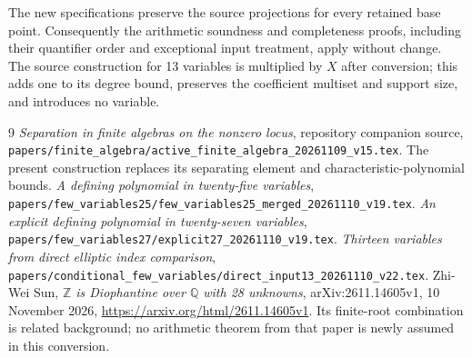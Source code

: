\documentclass[11pt,a4paper]{article}
\newcommand{\Q}{\mathbb Q}\newcommand{\Z}{\mathbb Z}
\begin{document}
The new specifications preserve the source projections for every retained
base point. Consequently the arithmetic soundness and completeness proofs,
including their quantifier order and exceptional input treatment, apply
without change. The source construction for 13 variables is multiplied by
$X$ after conversion; this adds one to its degree bound, preserves the
coefficient multiset and support size, and introduces no variable.

\begin{thebibliography}{9}
 \emph{Separation in finite algebras on the nonzero locus},
repository companion source, \nolinkurl{papers/finite_algebra/active_finite_algebra_20261109_v15.tex}.
The present construction replaces its separating element and characteristic-polynomial bounds.
 \emph{A defining polynomial in twenty-five variables},
\nolinkurl{papers/few_variables25/few_variables25_merged_20261110_v19.tex}.
 \emph{An explicit defining polynomial in twenty-seven variables},
\nolinkurl{papers/few_variables27/explicit27_20261110_v19.tex}.
 \emph{Thirteen variables from direct elliptic index comparison},
\nolinkurl{papers/conditional_few_variables/direct_input13_20261110_v22.tex}.
 Zhi-Wei Sun, \emph{$\Z$ is Diophantine over $\Q$ with 28 unknowns},
arXiv:2611.14605v1, 10 November 2026,
\url{https://arxiv.org/html/2611.14605v1}.
Its finite-root combination is related background; no arithmetic theorem
from that paper is newly assumed in this conversion.
\end{thebibliography}
\end{document}

